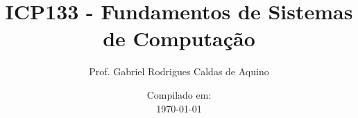\documentclass{beamer}
\title{ICP133 -  Fundamentos de Sistemas de Computação}
\author{Prof. Gabriel Rodrigues Caldas de Aquino}
\institute
{
    Instituto de Computação \\
    Universidade Federal do Rio de Janeiro\\
    gabrielaquino@ic.ufrj.br
}
\date{Compilado em: \\ \today}
\begin{document}
\begin{frame}
    \titlepage
\end{frame}

%
%
%
%
%
%
%
%


\end{document}
